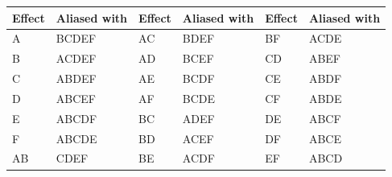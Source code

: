 \begin{tabular}{@{}llllll@{}}
\toprule
Effect & Aliased with & Effect & Aliased with & Effect & Aliased with \\
\midrule
A & BCDEF & AC & BDEF & BF & ACDE \\
B & ACDEF & AD & BCEF & CD & ABEF \\
C & ABDEF & AE & BCDF & CE & ABDF \\
D & ABCEF & AF & BCDE & CF & ABDE \\
E & ABCDF & BC & ADEF & DE & ABCF \\
F & ABCDE & BD & ACEF & DF & ABCE \\
AB & CDEF & BE & ACDF & EF & ABCD \\
\bottomrule
\end{tabular}
